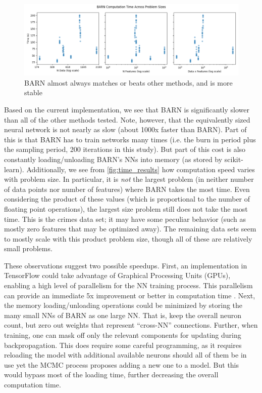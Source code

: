 \documentclass[12pt]{article}
\begin{document}
\begin{figure}[ht]
\centering
    \includegraphics[scale=.5]{time_results.png}
    \caption{BARN almost always matches or beats other methods, and is more stable}
    \label{fig:time_results}
\end{figure}

Based on the current implementation, we see that BARN is significantly slower than all of the other methods tested.  Note, however, that the equivalently sized neural network is not nearly as slow (about 1000x faster than BARN).  Part of this is that BARN has to train networks many times (i.e. the burn in period plus the sampling period, 200 iterations in this study).  But part of this cost is also constantly loading/unloading BARN's NNs into memory (as stored by scikit-learn).  Additionally, we see from \autoref{fig:time_results} how computation speed varies with problem size.  In particular, it is \emph{not} the largest problem (in neither number of data points nor number of features) where BARN takes the most time.  Even considering the product of these values (which is proportional to the number of floating point operations), the largest size problem still does not take the most time.  This is the crimes data set; it may have some peculiar behavior (such as mostly zero features that may be optimized away).  The remaining data sets seem to mostly scale with this product problem size, though all of these are relatively small problems.

These observations suggest two possible speedups.  First, an implementation in TensorFlow could take advantage of Graphical Processing Units (GPUs), enabling a high level of parallelism for the NN training process.  This parallelism can provide an immediate 5x improvement or better in computation time \cite{lind2019performance}.  Next, the memory loading/unloading operations could be minimized by storing the many small NNs of BARN as one large NN.  That is, keep the overall neuron count, but zero out weights that represent ``cross-NN'' connections.  Further, when training, one can mask off only the relevant components for updating during backpropagation.  This does require some careful programming, as it requires reloading the model with additional available neurons should all of them be in use yet the MCMC process proposes adding a new one to a model.  But this would bypass most of the loading time, further decreasing the overall computation time.
\end{document}
